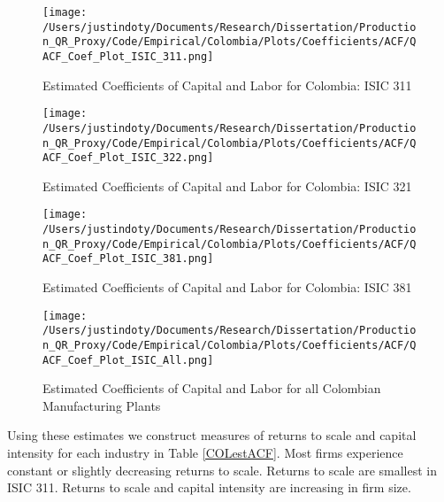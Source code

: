 \documentclass[11pt]{article}
\begin{document}
\begin{figure}[H]
\centering
\caption{Estimated Coefficients of Capital and Labor for Colombia: ISIC 311}
\texttt{[image: /Users/justindoty/Documents/Research/Dissertation/Production\_QR\_Proxy/Code/Empirical/Colombia/Plots/Coefficients/ACF/QACF\_Coef\_Plot\_ISIC\_311.png]}
\label{fig:ACFCOL311}
\end{figure}

\begin{figure}[H]
\centering
\caption{Estimated Coefficients of Capital and Labor for Colombia: ISIC 321}
\texttt{[image: /Users/justindoty/Documents/Research/Dissertation/Production\_QR\_Proxy/Code/Empirical/Colombia/Plots/Coefficients/ACF/QACF\_Coef\_Plot\_ISIC\_322.png]}
\label{fig:ACFCOL321}
\end{figure}

\begin{figure}[H]
\centering
\caption{Estimated Coefficients of Capital and Labor for Colombia: ISIC 381}
\texttt{[image: /Users/justindoty/Documents/Research/Dissertation/Production\_QR\_Proxy/Code/Empirical/Colombia/Plots/Coefficients/ACF/QACF\_Coef\_Plot\_ISIC\_381.png]}
\label{fig:ACFCOL381}
\end{figure}

\begin{figure}[H]
\centering
\caption{Estimated Coefficients of Capital and Labor for all Colombian Manufacturing Plants}
\texttt{[image: /Users/justindoty/Documents/Research/Dissertation/Production\_QR\_Proxy/Code/Empirical/Colombia/Plots/Coefficients/ACF/QACF\_Coef\_Plot\_ISIC\_All.png]}
\label{fig:ACFCOLall}
\end{figure}

Using these estimates we construct measures of returns to scale and capital intensity for each industry in Table \ref{COLestACF}. Most firms experience constant or slightly decreasing returns to scale. Returns to scale are smallest in ISIC 311. Returns to scale and capital intensity are increasing in firm size.
\end{document}
